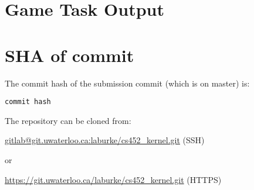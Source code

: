 \documentclass{article}
\begin{document}
\section*{Game Task Output}

\section*{SHA of commit}

The commit hash of the submission commit (which is on master) is:

\texttt{{{{commit hash}}}}

The repository can be cloned from:

\url{gitlab@git.uwaterloo.ca:laburke/cs452_kernel.git} (SSH)

or

\url{https://git.uwaterloo.ca/laburke/cs452_kernel.git} (HTTPS)
\end{document}
